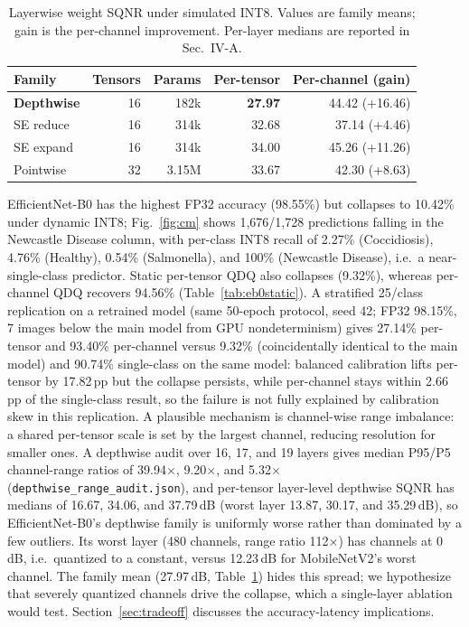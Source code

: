 \documentclass[conference,a4paper]{IEEEtran}
\begin{document}
\begin{table}[htbp]
\caption{Layerwise weight SQNR under simulated INT8. Values are family means; gain is the per-channel improvement. Per-layer medians are reported in Sec.~IV-A.}
\label{tab:sqnr}
\centering
\footnotesize
\setlength{\tabcolsep}{5pt}
\begin{tabular}{lrrrr}
\toprule
Family & Tensors & Params & Per-tensor & Per-channel (gain) \\
\midrule
\textbf{Depthwise} & 16 & 182k & \textbf{27.97} & 44.42 (+16.46) \\
SE reduce & 16 & 314k & 32.68 & 37.14 (+4.46) \\
SE expand & 16 & 314k & 34.00 & 45.26 (+11.26) \\
Pointwise & 32 & 3.15M & 33.67 & 42.30 (+8.63) \\
\bottomrule
\end{tabular}
\end{table}


EfficientNet-B0 has the highest FP32 accuracy (98.55\%) but collapses to 10.42\% under dynamic INT8; Fig.~\ref{fig:cm} shows 1,676/1,728 predictions falling in the Newcastle Disease column, with per-class INT8 recall of 2.27\% (Coccidiosis), 4.76\% (Healthy), 0.54\% (Salmonella), and 100\% (Newcastle Disease), i.e.\ a near-single-class predictor. Static per-tensor QDQ also collapses (9.32\%), whereas per-channel QDQ recovers 94.56\% (Table~\ref{tab:eb0static}). A stratified 25/class replication on a retrained model (same 50-epoch protocol, seed 42; FP32 98.15\%, 7 images below the main model from GPU nondeterminism) gives 27.14\% per-tensor and 93.40\% per-channel versus 9.32\% (coincidentally identical to the main model) and 90.74\% single-class on the same model: balanced calibration lifts per-tensor by 17.82\,pp but the collapse persists, while per-channel stays within 2.66\,pp of the single-class result, so the failure is not fully explained by calibration skew in this replication. A plausible mechanism is channel-wise range imbalance: a shared per-tensor scale is set by the largest channel, reducing resolution for smaller ones. A depthwise audit over 16, 17, and 19 layers gives median P95/P5 channel-range ratios of 39.94$\times$, 9.20$\times$, and 5.32$\times$ (\texttt{depthwise\_range\_audit.json}), and per-tensor layer-level depthwise SQNR has medians of 16.67, 34.06, and 37.79\,dB (worst layer 13.87, 30.17, and 35.29\,dB), so EfficientNet-B0's depthwise family is uniformly worse rather than dominated by a few outliers. Its worst layer (480 channels, range ratio 112$\times$) has channels at 0\,dB, i.e.\ quantized to a constant, versus 12.23\,dB for MobileNetV2's worst channel. The family mean (27.97\,dB, Table~\ref{tab:sqnr}) hides this spread; we hypothesize that severely quantized channels drive the collapse, which a single-layer ablation would test. Section~\ref{sec:tradeoff} discusses the accuracy-latency implications.
\end{document}
